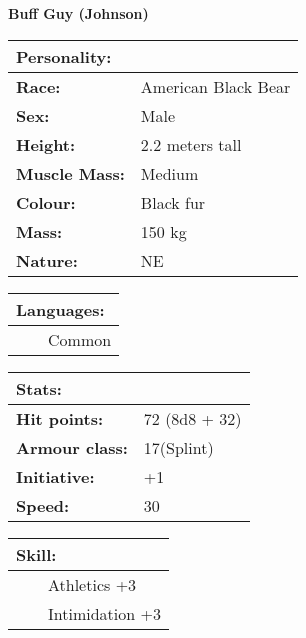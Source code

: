 \documentclass[11pt]{article}
\newcommand{\tabitem}{~~\llap{--}~~}
\begin{document}
	\begin{center}
\Huge \textbf{Buff Guy (Johnson)}
	\end{center}
	\begin{multicols}{2}
\noindent \begin{tabularx}{\linewidth}{@{}l l}
\Large \textbf{Personality:} 	& 							\\
\hline
\textbf{Race:} 					& American Black Bear	 	\\
\textbf{Sex:} 					& Male 						\\
\textbf{Height:} 				& 2.2 meters tall		 	\\
\textbf{Muscle Mass:} 			& Medium 					\\
\textbf{Colour:} 				& Black fur				 	\\
\textbf{Mass:} 					& 150 kg					\\
\textbf{Nature:} 				& NE
		\end{tabularx}

\vspace{4mm}

\noindent \begin{tabularx}{\linewidth}{@{}l}
{\Large \textbf{Languages:}} \\
\hline
\tabitem Common \\
		\end{tabularx}

\vspace{4mm}

\noindent \begin{tabularx}{\linewidth}{@{}l l}
\Large \textbf{Stats:}		 	& 									\\
\hline
\textbf{Hit points:} 			& 72 (8d8 + 32) 					\\
\textbf{Armour class:} 			& 17(Splint)					 	\\
\textbf{Initiative:} 			& +1								\\
\textbf{Speed:} 				& 30		 						\\
		\end{tabularx}

\vspace{2mm}

\noindent \begin{tabularx}{\linewidth}{@{}l}
{\Large \textbf{Skill:}} \\
\hline
\tabitem Athletics +3 \\
\tabitem Intimidation +3
		\end{tabularx}

\vspace{4mm}


\end{multicols}
\end{document}
